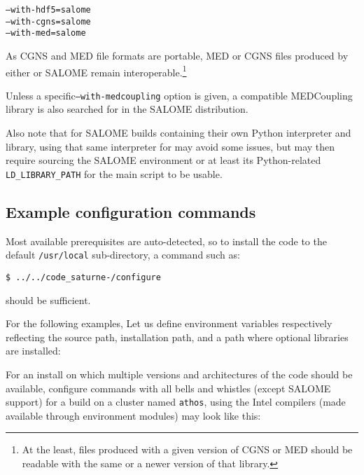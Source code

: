 \documentclass[a4paper,10pt,twoside]{csshortdoc}
\begin{document}
 \texttt{--with-hdf5=salome}\\
 \texttt{--with-cgns=salome}\\
 \texttt{--with-med=salome}

As CGNS and MED file formats are portable, MED or CGNS files produced
by either \CS or SALOME remain interoperable.\footnote{At the least,
files produced with a given version of CGNS or MED should be readable
with the same or a newer version of that library.}

Unless a specific\texttt{--with-medcoupling} option is given, a compatible
MEDCoupling library is also searched for in the SALOME distribution.

Also note that for SALOME builds containing their own Python interpreter and library,
using that same interpreter for \CS may avoid some issues, but may then require
sourcing the SALOME environment or at least its Python-related
\texttt{LD\_LIBRARY\_PATH} for the main \CS script to be usable.

\subsection{Example configuration commands\label{sec:config:examples}}

Most available prerequisites are auto-detected, so to install the
code to the default \texttt{/usr/local} sub-directory,
a command such as:

\texttt{\$ ../../code\_saturne-\verscs/configure}

should be sufficient.

For the following examples, Let us define environment variables respectively
reflecting the \CS source path, installation path, and a path where optional
libraries are installed:


For an install on which multiple
versions and architectures of the code should be available,
configure commands with all bells and whistles (except SALOME support) for a
build on a cluster named \texttt{athos}, using the Intel compilers
(made available through environment modules) may look like this:
\end{document}
